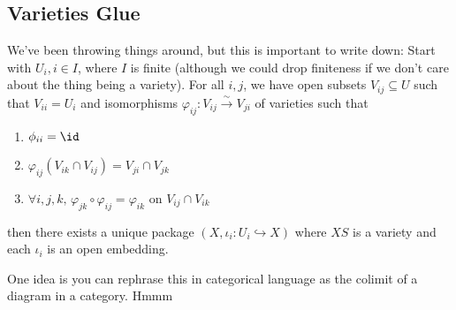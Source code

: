 \documentclass[12pt]{article}
\begin{document}
\subsection{Varieties Glue}
We've been throwing things around, but this is important to write down: Start with $U_i, i\in I$, where $I$ is finite 
(although we could drop finiteness if we don't care about the thing being a variety). For all $i,j$, we have open subsets 
$V_{ij}\subseteq U$ such that $V_{ii}=U_i$ and isomorphisms $\varphi_{ij}:V_{ij}\xrightarrow{\sim}V_{ji}$ of varieties such that 
\begin{enumerate}
	\item $\phi_{ii}=\id$
	\item $\varphi_{ij}(V_{ik}\cap V_{ij})=V_{ji}\cap V_{jk}$
	\item $\forall i,j,k,\, \varphi_{jk}\circ\varphi_{ij}=\varphi_{ik}$ on $V_{ij}\cap V_{ik}$
\end{enumerate}
then there exists a unique package $(X,\iota_i:U_i\hookrightarrow X)$ where $XS$ is a variety and each $\iota_i$ is an open embedding.

One idea is you can rephrase this in categorical language as the colimit of a diagram in a category. Hmmm
\end{document}
